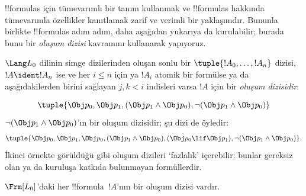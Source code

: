 \documentclass[../../../include/open-logic-section]{subfiles}
\begin{document}


!!{formula}s için tümevarımlı bir tanım kullanmak ve !!{formula}s hakkında
tümevarımla özellikler kanıtlamak zarif ve verimli bir yaklaşımdır. Bununla
birlikte !!{formula}s adım adım, daha aşağıdan yukarıya da kurulabilir;
burada bunu bir
\emph{oluşum dizisi} kavramını kullanarak yapıyoruz.

\begin{defn}
$\Lang L_0$ dilinin simge dizilerinden oluşan sonlu bir
$\tuple{!A_0,\dotsc,!A_n}$ dizisi, $!A \ident !A_n$ ise ve her $i \leq n$
için ya $!A_i$ atomik bir formülse ya da aşağıdakilerden birini sağlayan
$j,k < i$ indisleri varsa $!A$ için bir 
\emph{oluşum dizisidir}:
\begin{enumerate}
\end{enumerate}
\end{defn}

\begin{ex}
\[
\tuple{
    \Obj p_0,
    \Obj p_1,
    (\Obj p_1 \land \Obj p_0),
    \lnot (\Obj p_1 \land \Obj p_0)
}
\]
$\lnot (\Obj p_1 \land \Obj p_0)$'ın bir oluşum dizisidir; şu dizi de
öyledir:
\[
\tuple{
    \Obj p_0,
    \Obj p_1,
    \Obj p_0,
    (\Obj p_1 \land \Obj p_0),
    (\Obj p_0 \lif \Obj p_1),
    \lnot (\Obj p_1 \land \Obj p_0)
}.
\]
%
İkinci örnekte görüldüğü gibi oluşum dizileri `fazlalık' içerebilir: bunlar
gereksiz olan ya da kuruluşa katkıda bulunmayan formüllerdir.
\end{ex}

\begin{prop}
$\Frm[L_0]$'daki her !!{formula}~$!A$'nın bir oluşum dizisi vardır.
\end{prop}
\end{document}
